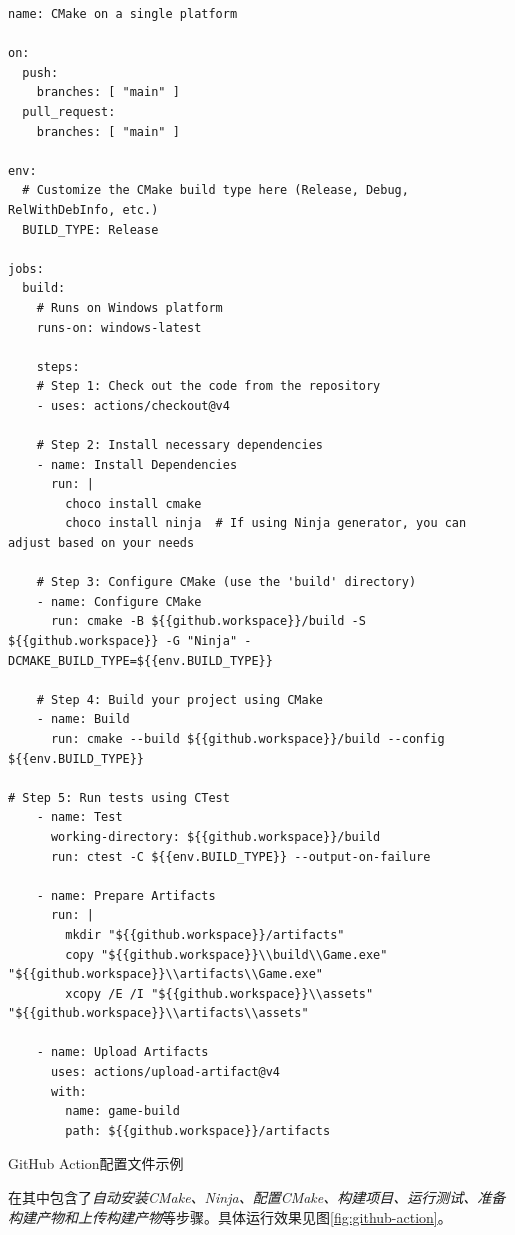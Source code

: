 \begin{longlisting}
    \begin{verbatim}
name: CMake on a single platform

on:
  push:
    branches: [ "main" ]
  pull_request:
    branches: [ "main" ]

env:
  # Customize the CMake build type here (Release, Debug, RelWithDebInfo, etc.)
  BUILD_TYPE: Release

jobs:
  build:
    # Runs on Windows platform
    runs-on: windows-latest

    steps:
    # Step 1: Check out the code from the repository
    - uses: actions/checkout@v4

    # Step 2: Install necessary dependencies
    - name: Install Dependencies
      run: |
        choco install cmake
        choco install ninja  # If using Ninja generator, you can adjust based on your needs

    # Step 3: Configure CMake (use the 'build' directory)
    - name: Configure CMake
      run: cmake -B ${{github.workspace}}/build -S ${{github.workspace}} -G "Ninja" -DCMAKE_BUILD_TYPE=${{env.BUILD_TYPE}}

    # Step 4: Build your project using CMake
    - name: Build
      run: cmake --build ${{github.workspace}}/build --config ${{env.BUILD_TYPE}}

# Step 5: Run tests using CTest
    - name: Test
      working-directory: ${{github.workspace}}/build
      run: ctest -C ${{env.BUILD_TYPE}} --output-on-failure

    - name: Prepare Artifacts
      run: |
        mkdir "${{github.workspace}}/artifacts"
        copy "${{github.workspace}}\\build\\Game.exe" "${{github.workspace}}\\artifacts\\Game.exe"
        xcopy /E /I "${{github.workspace}}\\assets" "${{github.workspace}}\\artifacts\\assets"

    - name: Upload Artifacts
      uses: actions/upload-artifact@v4
      with:
        name: game-build
        path: ${{github.workspace}}/artifacts
    \end{verbatim}
    \caption{GitHub Action配置文件示例}
    \label{listing:github-action}
\end{longlisting}

在其中包含了\textit{自动安装CMake、Ninja、配置CMake、构建项目、运行测试、准备构建产物和上传构建产物}等步骤。具体运行效果见图\ref{fig:github-action}。

